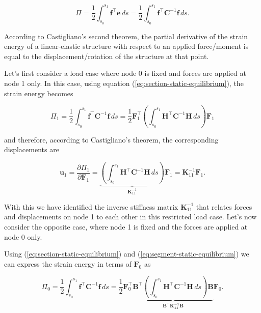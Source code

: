 \begin{equation}
\Pi = \frac{1}{2}\int_{s_0}^{s_1} \boldsymbol{f}^\intercal\boldsymbol{e}\,ds = \frac{1}{2}\int_{s_0}^{s_1} \boldsymbol{f}^\intercal\boldsymbol{C}^{-1}\boldsymbol{f}\,ds.
\end{equation}

According to Castigliano's second theorem, the partial derivative of the strain energy of a linear-elastic structure with respect to an applied force/moment is equal to the displacement/rotation of the structure at that point.

Let's first consider a load case where node 0 is fixed and forces are applied at node 1 only.
In this case, using equation (\ref{eq:section-static-equilibrium}), the strain energy becomes

\begin{equation}
\Pi_1 = \frac{1}{2}\int_{s_0}^{s_1} \boldsymbol{f}^\intercal\boldsymbol{C}^{-1}\boldsymbol{f}\,ds = \frac{1}{2}\boldsymbol{F}_1^\intercal\left(\int_{s_0}^{s_1} \boldsymbol{H}^\intercal\boldsymbol{C}^{-1}\boldsymbol{H}\,ds\right)\boldsymbol{F}_1
\end{equation}

and therefore, according to Castigliano's theorem, the corresponding displacements are

\begin{equation}
\boldsymbol{u}_{1} = \frac{\partial \Pi_1}{\partial \boldsymbol{F}_1} = \underbrace{\left(\int_{s_0}^{s_1} \boldsymbol{H}^\intercal\boldsymbol{C}^{-1}\boldsymbol{H}\,ds\right)}_{\boldsymbol{K}_{11}^{-1}}\boldsymbol{F}_1 = \boldsymbol{K}_{11}^{-1}\boldsymbol{F}_1.
\end{equation}

With this we have identified the inverse stiffness matrix $\boldsymbol{K}_{11}^{-1}$ that relates forces and displacements on node 1 to each other in this restricted load case.
Let's now consider the opposite case, where node 1 is fixed and the forces are applied at node 0 only.

Using (\ref{eq:section-static-equilibrium}) and (\ref{eq:segment-static-equilibrium}) we can express the strain energy in terms of $\boldsymbol{F}_0$ as

\begin{equation}
\Pi_0 = \frac{1}{2}\int_{s_0}^{s_1} \boldsymbol{f}^\intercal\boldsymbol{C}^{-1}\boldsymbol{f}\,ds = \frac{1}{2}\boldsymbol{F}_0^\intercal\underbrace{\boldsymbol{B}^\intercal\left(\int_{s_0}^{s_1} \boldsymbol{H}^\intercal\boldsymbol{C}^{-1}\boldsymbol{H}\,ds\right)\boldsymbol{B}}_{\boldsymbol{B}^\intercal\boldsymbol{K_{11}^{-1}\boldsymbol{B}}}\boldsymbol{F}_0.
\end{equation}

